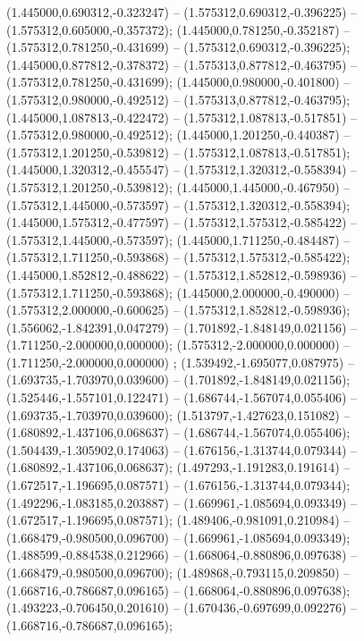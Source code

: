  (1.445000,0.690312,-0.323247) -- (1.575312,0.690312,-0.396225) -- (1.575312,0.605000,-0.357372);
 (1.445000,0.781250,-0.352187) -- (1.575312,0.781250,-0.431699) -- (1.575312,0.690312,-0.396225);
 (1.445000,0.877812,-0.378372) -- (1.575313,0.877812,-0.463795) -- (1.575312,0.781250,-0.431699);
 (1.445000,0.980000,-0.401800) -- (1.575312,0.980000,-0.492512) -- (1.575313,0.877812,-0.463795);
 (1.445000,1.087813,-0.422472) -- (1.575312,1.087813,-0.517851) -- (1.575312,0.980000,-0.492512);
 (1.445000,1.201250,-0.440387) -- (1.575312,1.201250,-0.539812) -- (1.575312,1.087813,-0.517851);
 (1.445000,1.320312,-0.455547) -- (1.575312,1.320312,-0.558394) -- (1.575312,1.201250,-0.539812);
 (1.445000,1.445000,-0.467950) -- (1.575312,1.445000,-0.573597) -- (1.575312,1.320312,-0.558394);
 (1.445000,1.575312,-0.477597) -- (1.575312,1.575312,-0.585422) -- (1.575312,1.445000,-0.573597);
 (1.445000,1.711250,-0.484487) -- (1.575312,1.711250,-0.593868) -- (1.575312,1.575312,-0.585422);
 (1.445000,1.852812,-0.488622) -- (1.575312,1.852812,-0.598936) -- (1.575312,1.711250,-0.593868);
 (1.445000,2.000000,-0.490000) -- (1.575312,2.000000,-0.600625) -- (1.575312,1.852812,-0.598936);
 (1.556062,-1.842391,0.047279) -- (1.701892,-1.848149,0.021156) -- (1.711250,-2.000000,0.000000);
 (1.575312,-2.000000,0.000000) -- (1.711250,-2.000000,0.000000) ;
 (1.539492,-1.695077,0.087975) -- (1.693735,-1.703970,0.039600) -- (1.701892,-1.848149,0.021156);
 (1.525446,-1.557101,0.122471) -- (1.686744,-1.567074,0.055406) -- (1.693735,-1.703970,0.039600);
 (1.513797,-1.427623,0.151082) -- (1.680892,-1.437106,0.068637) -- (1.686744,-1.567074,0.055406);
 (1.504439,-1.305902,0.174063) -- (1.676156,-1.313744,0.079344) -- (1.680892,-1.437106,0.068637);
 (1.497293,-1.191283,0.191614) -- (1.672517,-1.196695,0.087571) -- (1.676156,-1.313744,0.079344);
 (1.492296,-1.083185,0.203887) -- (1.669961,-1.085694,0.093349) -- (1.672517,-1.196695,0.087571);
 (1.489406,-0.981091,0.210984) -- (1.668479,-0.980500,0.096700) -- (1.669961,-1.085694,0.093349);
 (1.488599,-0.884538,0.212966) -- (1.668064,-0.880896,0.097638) -- (1.668479,-0.980500,0.096700);
 (1.489868,-0.793115,0.209850) -- (1.668716,-0.786687,0.096165) -- (1.668064,-0.880896,0.097638);
 (1.493223,-0.706450,0.201610) -- (1.670436,-0.697699,0.092276) -- (1.668716,-0.786687,0.096165);
